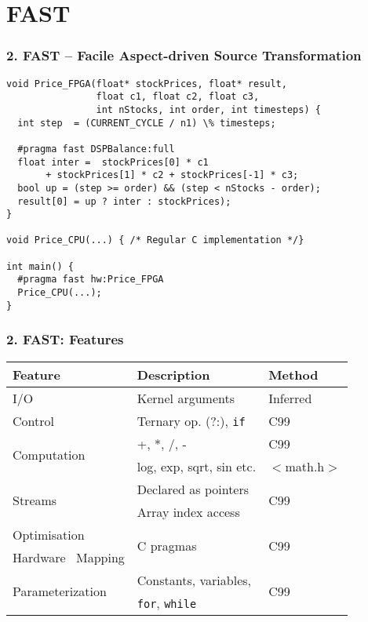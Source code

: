 \section{FAST}

\begin{frame}[fragile]
  \frametitle{2. FAST -- Facile Aspect-driven Source Transformation}

\begin{lstlisting}
void Price_FPGA(float* stockPrices, float* result,
                float c1, float c2, float c3,
                int nStocks, int order, int timesteps) {
  int step  = (CURRENT_CYCLE / n1) \% timesteps;

  #pragma fast DSPBalance:full
  float inter =  stockPrices[0] * c1
       + stockPrices[1] * c2 + stockPrices[-1] * c3;
  bool up = (step >= order) && (step < nStocks - order);
  result[0] = up ? inter : stockPrices);
}

void Price_CPU(...) { /* Regular C implementation */}

int main() {
  #pragma fast hw:Price_FPGA
  Price_CPU(...);
}
\end{lstlisting}
\end{frame}

\begin{frame}
  \frametitle{2. FAST: Features}

\begin{table}[!h]
  \centering
\renewcommand{\arraystretch}{1.4}
\begin{tabular}{l|l|l}
\hline
\bf{Feature}                        & \bf{Description}              & \bf{Method}          \\
\hline\hline
  I/O                               & Kernel arguments              & Inferred             \\
\hline
  Control                           & Ternary op. (?:), \texttt{if} & C99                  \\
\hline
\multirow{2}{*}{Computation}        & +, *, /, -                    & C99                  \\
                                    & log, exp, sqrt, sin etc.      & $<$math.h$>$         \\
\hline
  \multirow{2}{*}{Streams}          & Declared as pointers          & \multirow{2}{*}{C99} \\
                                    & Array index access     &                      \\
\hline
  Optimisation                      & \multirow{2}{*}{C pragmas}    & \multirow{2}{*}{C99} \\
  Hardware \  Mapping               &                               &                      \\
\hline
  \multirow{2}{*}{Parameterization} & Constants, variables,         & \multirow{2}{*}{C99} \\
                                    & \texttt{for}, \texttt{while}  &                      \\
\end{tabular}
\end{table}
\end{frame}

